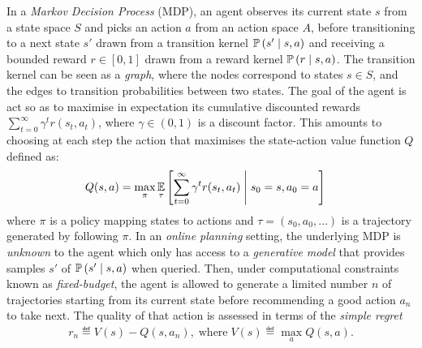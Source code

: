 \documentclass[runningheads]{llncs}
\begin{document}
In a \emph{Markov Decision Process} (MDP), an agent observes its current state $s$ from a state space $S$ and picks an action $a$ from an action space $A$, before transitioning to a next state $s'$ drawn from a transition kernel $\mathbb{P}\left(s'\;\middle|\; s,a\right)$ and receiving a bounded reward $r\in[0, 1]$ drawn from a reward kernel $\mathbb{P}\left(r \;\middle|\; s, a\right)$. The transition kernel can be seen as a \emph{graph}, where the nodes correspond to states $s\in S$, and the edges to transition probabilities between two states. The goal of the agent is act so as to maximise in expectation its cumulative discounted rewards $\sum_{t=0}^\infty \gamma^t r(s_t, a_t)$, where $\gamma\in(0, 1)$ is a discount factor. This amounts to choosing at each step the action that maximises the state-action value function $Q$ defined as:
\begin{align*}
Q(s, a) &= \max_\pi  \operatorname*{\mathbb{E}}_\tau \left[\sum_{t=0}^\infty \gamma^t r(s_t, a_t)\;\middle|\; s_0 = s, a_0 = a\right]
\end{align*}
where $\pi$ is a policy mapping states to actions and $\tau = (s_0, a_0, \dots)$ is a trajectory generated by following $\pi$. In an \emph{online planning} setting, the underlying MDP is \emph{unknown} to the agent which only has access to a \emph{generative model} that provides samples $s'$ of $\mathbb{P}\left(s' \;\middle|\; s, a\right)$ when queried. Then, under computational constraints known as \emph{fixed-budget}, the agent is allowed to generate a limited number $n$ of trajectories starting from its current state before recommending a good action $a_n$ to take next.
The quality of that action is assessed in terms of the \emph{simple regret}
\begin{align}
	r_n \eqdef V(s) - Q(s, {a}_n), \; \mbox{where} \; V(s) \eqdef  \max_a Q(s, a).
\end{align}
\end{document}
